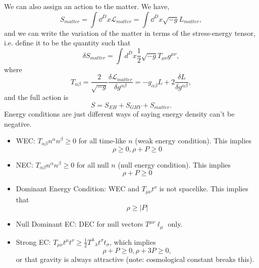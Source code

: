 \documentclass{article}
\numberwithin{equation}{section}
\begin{document}
We can also assign an action to the matter. We have, 
\begin{equation}
   S_{matter} = \int \dd^D{x} \mathcal{L}_{matter} = \int \dd^D{x} \sqrt{-g}L_{matter},
\end{equation}
and we can write the variation of the matter in terms of the stress-energy tensor, i.e. define it to be the quantity such that 
\begin{equation}
   \delta S_{matter} = \int d^Dx \frac{1}{2}\sqrt{-g}T_{\mu\nu}g^{\mu\nu},
\end{equation}
where 
\begin{equation}
   T_{\alpha\beta} = \frac{2}{\sqrt{-g}}\frac{\delta \mathcal{L}_{matter}}{\delta g^{\alpha\beta}} = - g_{\alpha\beta}L + 2\frac{\delta L}{\delta g^{\alpha\beta}},
\end{equation}
and the full action is 
\begin{equation}
   S  = S_{EH} + S_{GHY} + S_{matter}.
\end{equation}
Energy conditions are just different ways of saying energy density can't be negative.
\begin{itemize}
   \item WEC: $T_{\alpha\beta}n^\alpha n^\beta \geq 0$ for all time-like $n$ (weak energy condition). This implies 
   \begin{equation}
      \rho\ge 0, \rho + P \ge 0
   \end{equation}
   \item NEC: $T_{\alpha\beta}n^\alpha n^\beta \geq 0$ for all null $n$ (null energy condition). This implies
   \begin{equation}
      \rho + P \ge 0
   \end{equation}
   \item Dominant Energy Condition: WEC and $T_{\mu\nu}t^{\nu}$ is not spacelike. This implies that 
   \begin{equation}
      \rho \ge |P|
   \end{equation}
   \item Null Dominant EC: DEC for null vectors $T^{\mu\nu}\ell_\mu$ only.
   \item Strong EC: $T_{\mu\nu}t^{\mu}t^\nu \ge \frac{1}{2}T^{\lambda}{}_{\lambda} t^\sigma t_{\sigma}$, which implies 
   \begin{equation}
      \rho + P \ge 0, \rho + 3P \ge 0,
   \end{equation}
   or that gravity is always attractive (note: cosmological constant breaks this).
\end{itemize}
\end{document}

